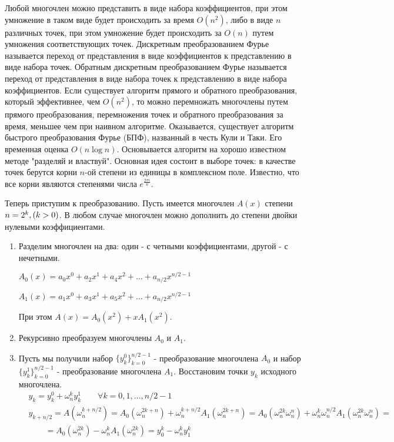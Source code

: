 \documentclass[12pt]{article}
\begin{document}
	Любой многочлен можно представить в виде набора коэффициентов, при этом умножение в таком виде будет происходить за время $O(n^2)$, либо в виде $n$ различных точек, при этом умножение будет происходить за $O(n)$ путем умножения соответствующих точек. Дискретным преобразованием Фурье называется переход от представления в виде коэффициентов к представлению в виде набора точек. Обратным дискретным преобразованием Фурье называется переход от представления в виде набора точек к представлению в виде набора коэффициентов. Если существует алгоритм прямого и обратного преобразования, который эффективнее, чем $O(n^2)$, то можно перемножать многочлены путем прямого преобразования, перемножения точек и обратного преобразования за время, меньшее чем при наивном алгоритме. Оказывается, существует алгоритм быстрого преобразования Фурье (БПФ), названный в честь Кули и Таки. Его временная оценка $O(n\log n)$. Основывается алгоритм на хорошо известном методе "разделяй и властвуй". Основная идея состоит в выборе точек: в качестве точек берутся корни $n$-ой степени из единицы в комплексном поле. Известно, что все корни являются степенями числа $e^{\frac{2\pi i}{n}}$.
	
	Теперь приступим к преобразованию. Пусть имеется многочлен $A(x)$ степени $ \\ n = 2^k, (k > 0)$. В любом случае многочлен можно дополнить до степени двойки нулевыми коэффициентами.
	\begin{enumerate}
		\item Разделим многочлен на два: один - с четными коэффициентами, другой - с нечетными.
		
		$A_0 (x) = a_0x^0 + a_2x^1+a_4x^2 + \ldots + a_{n/2}x^{n/2 - 1}$
		
		$A_1 (x) = a_1x^0 + a_3x^1 + a_5x^2 + \ldots + a_{n/2}x^{n/2-1}$
		
		При этом $A(x) = A_0(x^2) + x A_1(x^2)$.
		\item Рекурсивно преобразуем многочлены $A_0$ и $A_1$.
		\item Пусть мы получили набор $\{y_k^0\}_{k = 0}^{n/2 -1}$ - преобразование многочлена $A_0$ и набор $\{y_k^1\}_{k = 0}^{n/2 -1}$ - преобразование многочлена $A_1$. Восстановим точки $y_k$ исходного многочлена.
		\begin{eqnarray*}
			& y_k = y_k^0 + \omega_n^k y_k^1 \qquad \forall k = 0, 1, \ldots, n/2 - 1 & \\
				& y_{k + n/2} = A(\omega_n^{k + n/2}) = A_0(\omega_n^{2k + n}) + \omega_n^{k + n/2} A_1(\omega_n^{2k+n})  = A_0(\omega_n^{2k} \omega_n^n) + \omega_n^k \omega_n^{n/2} A_1(\omega_n^{2k} \omega_n^n) = & \\
				& \qquad= A_0(\omega_n^{2k}) - \omega_n^k A_1(\omega_n^{2k}) = y_0^k - \omega_n^k y_1^k
		\end{eqnarray*}
	
	\end{enumerate}
\end{document}
